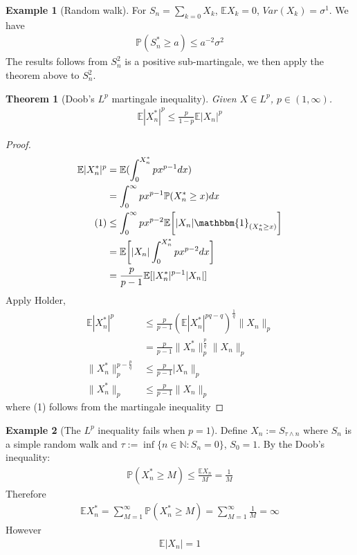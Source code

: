 \documentclass[a4paper,11pt]{book}
\newtheorem{theorem}{Theorem}[section]
\theoremstyle{definition}
\newtheorem*{example}{Example}
\theoremstyle{remark}
\begin{document}
\begin{example}[Random walk]
For $S_n = \sum_{k = 0} X_k$, $\mathbb{E}X_k = 0$, $Var(X_k) = \sigma^1$. We have
\begin{align*}
	\mathbb{P}(S^*_n \ge  a) \le a^{-2} \sigma^2
\end{align*}	
The results follows from $S^2_n$ is a positive sub-martingale, we then apply the theorem above to $S_n^2$.
\end{example}


\begin{theorem}[Doob's $L^p$ martingale inequality]
	Given $X \in L^p$, $p \in (1, \infty)$.
	\begin{align*}
		\mathbb{E}|X^*_n|^p \leq \frac{p}{1-p} \mathbb{E}|X_n|^p
	\end{align*}
\end{theorem}
\begin{proof}
	\begin{align*}
		\mathbb{E}|X_n^*|^p &= \mathbb{E}( \int_0^{X^*_n} px^{p-1} dx) \\
		&= \int_0^\infty px^{p-1} \mathbb{P}(X_n^* \ge x )dx\\
	(1)	&\leq \int_0^\infty px ^{p-2}  \mathbb{E}\bigg[|X_n| \mathbbm{1}_{(X_n^* \ge x)}\bigg]\\
		&= \mathbb{E}\bigg[ |X_n| \int_0^{X_n^*} px^{p-2}dx\bigg] \\
		&= \frac{p}{p-1}\mathbb{E}[|X_n^*|^{p-1}|X_n|]
	\end{align*}
	Apply Holder, 
	\begin{align*}
	\mathbb{E}|X_n^*|^p &\le  \frac{p}{p-1} (\mathbb{E}|X_n^*|^{pq - q})^{\frac{1}{q}} \|X_n\|_p\\
	&= \frac{p}{p-1} \|X_n^*\|_p^\frac{p}{q} \|X_n \|_p\\
	\|X_n^*\|_p^{p - \frac{p}{q}} &\leq \frac{p}{p-1}|X_n\|_p\\
	\|X_n^*\|_p &\leq \frac{p}{p-1}\|X_n\|_p
	\end{align*}
	where (1) follows from the martingale inequality
\end{proof}

\begin{example}[The $L^p$ inequality fails when $p = 1$]
Define $X_n:= S_{\tau \wedge n}$ where $S_n$ is a simple random walk and $\tau:= \inf \{n \in \mathbb{N} : S_n = 0 \} $, $S_0 = 1$. By the Doob's inequality:
\begin{align*}
	\mathbb{P}(X_n^* \geq M ) \le \frac{\mathbb{E}X_n}{M} = \frac{1}{M}
\end{align*}
Therefore
\begin{align*}
	\mathbb{E}X_n^* = \sum_{M = 1}^\infty \mathbb{P}(X_n^* \ge M) = \sum_{M = 1}^\infty \frac{1}{M} = \infty
\end{align*}
However
\begin{align*}
	\mathbb{E}|X_n| = 1
\end{align*}
\end{example}
\end{document}
